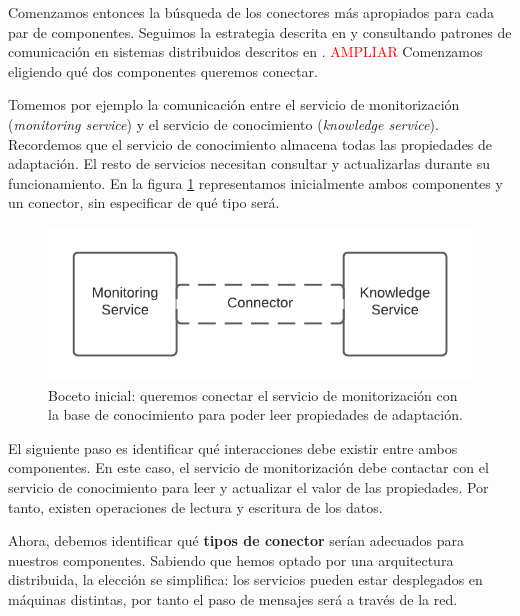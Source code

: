 Comenzamos entonces la búsqueda de los conectores más apropiados para cada par de componentes. Seguimos la estrategia descrita en \cite{taylorSoftwareArchitectureFoundations2009} y consultando patrones de comunicación en sistemas distribuidos descritos en \cite{newmanBuildingMicroservicesDesigning2021}. \textcolor{red}{AMPLIAR} Comenzamos eligiendo qué dos componentes queremos conectar.

Tomemos por ejemplo la comunicación entre el servicio de monitorización (\emph{monitoring service}) y el servicio de conocimiento (\emph{knowledge service}). Recordemos que el servicio de conocimiento almacena todas las propiedades de adaptación. El resto de servicios necesitan consultar y actualizarlas durante su funcionamiento. En la figura \ref{fig:monitor-knowledge-initial} representamos inicialmente ambos componentes y un conector, sin especificar de qué tipo será.

\begin{figure}[htb]
  \centering
  \includegraphics{03_arquitectura/images/Monitor-Knowledge-Initial-Connector}
  \caption{Boceto inicial: queremos conectar el servicio de monitorización con la base de conocimiento para poder leer propiedades de adaptación.}
  \label{fig:monitor-knowledge-initial}
\end{figure}

El siguiente paso es identificar qué interacciones debe existir entre ambos componentes. En este caso, el servicio de monitorización debe contactar con el servicio de conocimiento para leer y actualizar el valor de las propiedades. Por tanto, existen operaciones de lectura y escritura de los datos.

Ahora, debemos identificar qué \textbf{tipos de conector} serían adecuados para nuestros componentes. Sabiendo que hemos optado por una arquitectura distribuida, la elección se simplifica: los servicios pueden estar desplegados en máquinas distintas, por tanto el paso de mensajes será a través de la red.

